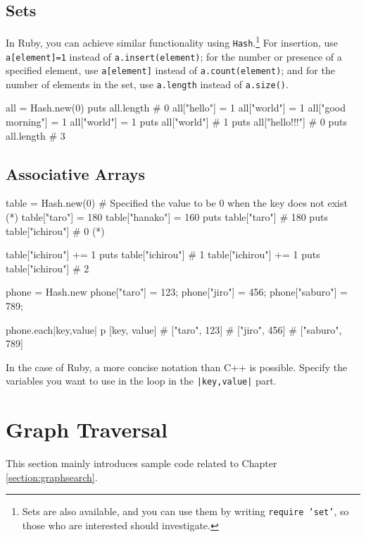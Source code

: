 \subsection{Sets}

In Ruby, you can achieve similar functionality using \texttt{Hash}.\footnote{Sets are also available, and you can use them by writing \texttt{require 'set'}, so those who are interested should investigate.}
For insertion, use \texttt{a[element]=1} instead of \texttt{a.insert(element)}; for the number or presence of a specified element, use \texttt{a[element]} instead of \texttt{a.count(element)}; and for the number of elements in the set, use \texttt{a.length} instead of \texttt{a.size()}.

\begin{rbox}
all = Hash.new(0)
puts all.length # 0
all["hello"] = 1
all["world"] = 1
all["good morning"] = 1
all["world"] = 1
puts all["world"] # 1
puts all["hello!!!"] # 0
puts all.length # 3
\end{rbox}

\subsection{Associative Arrays}

\begin{rbox}[emph={Hash}]
table = Hash.new(0) # Specified the value to be 0 when the key does not exist (*)
table["taro"] = 180
table["hanako"] = 160
puts table["taro"] # 180
puts table["ichirou"] # 0 (*)
\end{rbox}

\begin{rbox}
table["ichirou"] += 1
puts table["ichirou"] # 1
table["ichirou"] += 1
puts table["ichirou"] # 2
\end{rbox}


\begin{rbox}
phone = Hash.new
phone["taro"] = 123;
phone["jiro"] = 456;
phone["saburo"] = 789;

phone.each{|key,value|
  p [key, value]
}
# ["taro", 123]
# ["jiro", 456]
# ["saburo", 789]
\end{rbox}

In the case of Ruby, a more concise notation than C++ is possible. Specify the variables you want to use in the loop in the \texttt{|key,value|} part.

\section{Graph Traversal}
This section mainly introduces sample code related to Chapter \ref{section:graphsearch}.

